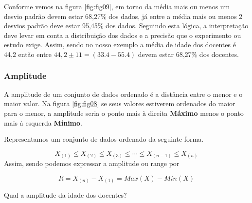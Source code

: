 \documentclass[12pt,]{style/krantz}
\makeatletter
\newenvironment{Shaded}{\begin{snugshade}}{\end{snugshade}}
\newcommand{\KeywordTok}[1]{\textcolor[rgb]{0.13,0.29,0.53}{\textbf{#1}}}
\newcommand{\DataTypeTok}[1]{\textcolor[rgb]{0.13,0.29,0.53}{#1}}
\newcommand{\DecValTok}[1]{\textcolor[rgb]{0.00,0.00,0.81}{#1}}
\newcommand{\StringTok}[1]{\textcolor[rgb]{0.31,0.60,0.02}{#1}}
\newcommand{\CommentTok}[1]{\textcolor[rgb]{0.56,0.35,0.01}{\textit{#1}}}
\newcommand{\OtherTok}[1]{\textcolor[rgb]{0.56,0.35,0.01}{#1}}
\newcommand{\OperatorTok}[1]{\textcolor[rgb]{0.81,0.36,0.00}{\textbf{#1}}}
\newcommand{\NormalTok}[1]{#1}
\newenvironment{kframe}{%
\medskip{}
\setlength{\fboxsep}{.8em}
 \def\at@end@of@kframe{}%
 \ifinner\ifhmode%
  \def\at@end@of@kframe{\end{minipage}}%
  \begin{minipage}{\columnwidth}%
 \fi\fi%
 \def\FrameCommand##1{\hskip\@totalleftmargin \hskip-\fboxsep
 \colorbox{shadecolor}{##1}\hskip-\fboxsep
     \hskip-\linewidth \hskip-\@totalleftmargin \hskip\columnwidth}%
 \MakeFramed {\advance\hsize-\width
   \@totalleftmargin\z@ \linewidth\hsize
   \@setminipage}}%
 {\par\unskip\endMakeFramed%
 \at@end@of@kframe}
\renewenvironment{Shaded}{\begin{kframe}}{\end{kframe}}
\theoremstyle{definition}
\theoremstyle{definition}
\theoremstyle{definition}
\theoremstyle{remark}
\let\BeginKnitrBlock\begin \let\EndKnitrBlock\end
\makeatother
\begin{document}
Conforme vemos na figura \ref{fig:fig09}, em torno da média mais ou
menos um desvio padrão devem estar 68,27\% dos dados, já entre a média
mais ou menos 2 desvios padrão deve estar 95,45\% dos dados. Seguindo
esta lógica, a interpretação deve levar em conta a distribuição dos
dados e a precisão que o experimento ou estudo exige. Assim, sendo no
nosso exemplo a média de idade dos docentes é 44,2 então entre
\(44,2 \pm 11 = (33.4-55.4)\) devem estar 68,27\% dos docentes.

\subsubsection{Amplitude}\label{amplitude}

A amplitude de um conjunto de dados ordenado é a distância entre o menor
e o maior valor. Na figura \ref{fig:fig08} se seus valores estiverem
ordenados do maior para o menor, a amplitude seria o ponto mais à
direita \textbf{Máximo} menos o ponto mais à esquerda \textbf{Mínimo}.

Representamos um conjunto de dados ordenado da seguinte forma.

\[X_{(1)}\leq X_{(2)}\leq X_{(3)}\leq \cdots \leq X_{(n-1)}\leq X_{(n)}\]
Assim, sendo podemos expressar a amplitude ou range por

\[R = X_{(n)} - X_{(1)} = Max(X) - Min(X)\]

\BeginKnitrBlock{example}
\protect\hypertarget{exm:unnamed-chunk-64}{}{\label{exm:unnamed-chunk-64}
}Qual a amplitude da idade dos docentes?
\EndKnitrBlock{example}

\begin{Shaded}
\end{Shaded}
\end{document}
